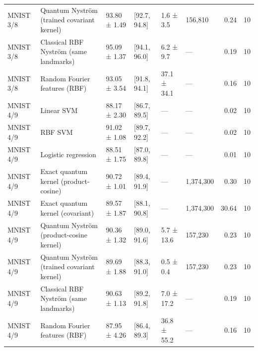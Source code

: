 \begin{table}
\begin{tabular}{llllllrr}
MNIST 3/8 & Quantum Nyström (trained covariant kernel) & 93.80 ± 1.49 & [92.7, 94.8] & 1.6 ± 3.5 & 156,810 & 0.24 & 10 \\
MNIST 3/8 & Classical RBF Nyström (same landmarks) & 95.09 ± 1.37 & [94.1, 96.0] & 6.2 ± 9.7 & — & 0.19 & 10 \\
MNIST 3/8 & Random Fourier features (RBF) & 93.05 ± 3.54 & [91.8, 94.1] & 37.1 ± 34.1 & — & 0.16 & 10 \\
MNIST 4/9 & Linear SVM & 88.17 ± 2.30 & [86.7, 89.5] & — & — & 0.02 & 10 \\
MNIST 4/9 & RBF SVM & 91.02 ± 1.08 & [89.7, 92.2] & — & — & 0.02 & 10 \\
MNIST 4/9 & Logistic regression & 88.51 ± 1.75 & [87.0, 89.8] & — & — & 0.01 & 10 \\
MNIST 4/9 & Exact quantum kernel (product-cosine) & 90.72 ± 1.01 & [89.4, 91.9] & — & 1,374,300 & 0.30 & 10 \\
MNIST 4/9 & Exact quantum kernel (covariant) & 89.57 ± 1.87 & [88.1, 90.8] & — & 1,374,300 & 30.64 & 10 \\
MNIST 4/9 & Quantum Nyström (product-cosine kernel) & 90.36 ± 1.32 & [89.0, 91.6] & 5.7 ± 13.6 & 157,230 & 0.23 & 10 \\
MNIST 4/9 & Quantum Nyström (trained covariant kernel) & 89.69 ± 1.88 & [88.3, 91.0] & 0.5 ± 0.4 & 157,230 & 0.23 & 10 \\
MNIST 4/9 & Classical RBF Nyström (same landmarks) & 90.63 ± 1.13 & [89.2, 91.8] & 7.0 ± 17.2 & — & 0.19 & 10 \\
MNIST 4/9 & Random Fourier features (RBF) & 87.95 ± 4.26 & [86.4, 89.3] & 36.8 ± 55.2 & — & 0.16 & 10 \\
\bottomrule
\end{tabular}
\end{table}
